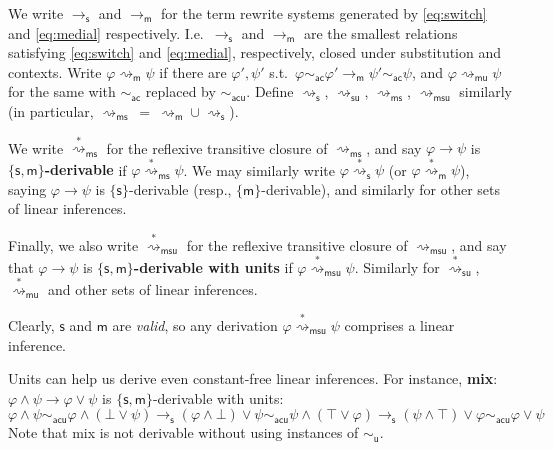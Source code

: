 \documentclass[a4paper, UKenglish, cleveref]{lipics-v2021}
\renewcommand{\phi}{\varphi}
\newcommand{\m}{\ensuremath{\mathsf{m}}}
\newcommand{\s}{\ensuremath{\mathsf{s}}}
\newcommand{\ms}{\ensuremath{\mathsf{ms}}}
\newcommand{\msu}{\ensuremath{\mathsf{msu}}}
\newcommand{\ac}{\ensuremath{\mathsf{ac}}}
\newcommand{\un}{\ensuremath{\mathsf{u}}}
\newcommand{\acu}{\ensuremath{\mathsf{acu}}}
\newcommand{\red}{\ensuremath{\overset{*}{\rightsquigarrow}}}
\newcommand{\redms}{\ensuremath{\red_\ms}}
\newcommand{\redmsu}{\ensuremath{\red_\msu}}
\newcommand{\reds}{\ensuremath{\red_\s}}
\newcommand{\redm}{\ensuremath{\red_\m}}
\newcommand{\redsu}{\ensuremath{\red_{\s\un}}}
\newcommand{\redmu}{\ensuremath{\red_{\m\un}}}
\begin{document}
\begin{definition}[Rewriting]
We write $\to_\s$ and $\to_\m$ for the term rewrite systems generated by \eqref{eq:switch} and \eqref{eq:medial} respectively.
I.e.\ $\to_\s$ and $\to_\m$ are the smallest relations satisfying \eqref{eq:switch} and \eqref{eq:medial}, respectively, closed under substitution
%
and contexts. Write \(\phi \rightsquigarrow_\m \psi\) if there are $\phi', \psi'$ s.t.\ \(\phi \sim_\ac \phi' \to_\m \psi' \sim_\ac \psi\), and \(\phi \rightsquigarrow_{\m\un} \psi\) for the same with \(\sim_\ac\) replaced by \(\sim_\acu\). Define \(\rightsquigarrow_\s\), \(\rightsquigarrow_{\s\un}\), \(\rightsquigarrow_{\ms}\), \(\rightsquigarrow_\msu\) similarly (in particular, $\rightsquigarrow_{\ms} \ = \ \rightsquigarrow_{\m} \cup \rightsquigarrow_{\s}$).

We write $\redms $ for the reflexive transitive closure of \(\rightsquigarrow_\ms\), and say $\phi \to \psi$ is \textbf{$\{\s,\m\}$-derivable} if \(\phi \redms \psi\).
%
%
We may similarly write \(\phi \reds \psi\) (or \(\phi \redm \psi\)), saying $\phi \to \psi$ is $\{\s\}$-derivable (resp., $\{\m\}$-derivable), and similarly for other sets of linear inferences.

Finally, we also write \(\redmsu \) for the reflexive transitive closure of $\rightsquigarrow_\msu$, and say that $\phi\to\psi$ is $\{\s,\m \}$\textbf{-derivable with units} if $\phi \redmsu \psi$.
%
Similarly for $\redsu$, $\redmu$ and other sets of linear inferences.
\end{definition}

%
%
%
%
%
%
%
%

Clearly, $\s$ and $\m$ are \emph{valid}, so any derivation $\phi \redmsu \psi$ comprises a linear inference.


\begin{example}
[`Mix']
\label{ex:mix}
%
Units can help us derive even constant-free linear inferences.
For instance, \textbf{mix}: \(\phi \land \psi \to \phi \lor \psi\) is $\{\s,\m\}$-derivable with units:
  \[\phi \land \psi \sim_\acu \phi \land (\bot \lor \psi) \to_\s (\phi \land \bot) \lor \psi \sim_\acu \psi \land (\top \lor \phi) \to_\s (\psi \land \top) \lor \phi \sim_\acu \phi \lor \psi\]
  Note that mix is not derivable without using instances of $\sim_\un$.
\end{example}
\end{document}
